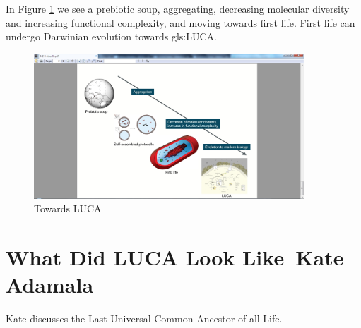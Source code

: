 \documentclass[]{article}
\begin{document}
In Figure \ref{fig:TowardsLUCA} we see a prebiotic soup, aggregating, decreasing molecular diversity and increasing functional complexity, and moving towards first life. First life can undergo Darwinian evolution towards \gls{gls:LUCA}.
\begin{figure}[H]
	\caption{Towards LUCA}\label{fig:TowardsLUCA}
	\includegraphics[width=0.9\textwidth]{TowardsLUCA}
\end{figure}

\section[What Did LUCA Look Like]{What Did LUCA Look Like--Kate Adamala}

Kate discusses the Last Universal Common Ancestor of all Life.
\end{document}
